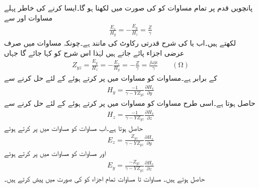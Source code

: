 پانچویں قدم پر تمام مساوات کو  کی صورت میں لکھنا ہو گا۔ایسا کرنے کی خاطر پہلے مساوات  اور  سے
\begin{align}\label{مساوات_میوج_ح}
\frac{E_z}{H_y}=-\frac{E_y}{H_z}=\frac{Z}{\gamma}
\end{align}
لکھتے ہیں۔اب  یا  کی شرح قدرتی رکاوٹ کی مانند ہے۔چونکہ  مساوات  میں صرف عرضی اجزاء پائے جاتے ہیں لہٰذا اس شرح کو   کہا جائے گا جہاں
\begin{align}\label{مساوات_میوج_خ}
Z_{yz}=\frac{E_y}{H_z}=-\frac{E_z}{H_y}=-\frac{Z}{\gamma}=\frac{j\omega \mu}{\gamma}  \quad \quad (\si{\ohm})
\end{align}
کے برابر ہے۔مساوات  کو مساوات  میں پر کرتے ہوئے  کے لئے حل کرنے سے
\begin{align}\label{مساوات_میوج_د}
H_y=\frac{-1}{\gamma-Y Z_{yz}} \frac{\partial H_x}{\partial y}
\end{align}
حاصل ہوتا ہے۔اسی طرح  مساوات  کو مساوات  میں پر کرتے ہوئے  کے لئے حل کرنے سے
\begin{align}\label{مساوات_میوج_ڈ}
H_z=\frac{-1}{\gamma-Y Z_{yz}} \frac{\partial H_x}{\partial z}
\end{align}
حاصل ہوتا ہے۔اب مساوات  کو مساوات  میں پر کرتے ہوئے
\begin{align}\label{مساوات_میوج_ذ}
E_z=\frac{Z_{yz}}{\gamma-Y Z_{yz}}\frac{\partial H_x}{\partial y}
\end{align}
اور مساوات  کو مساوات  میں پر کرتے ہوئے
\begin{align}\label{مساوات_میوج_ر}
E_y=\frac{-Z_{yz}}{\gamma-Y Z_{yz}}\frac{\partial H_x}{\partial z}
\end{align}
حاصل ہوتے ہیں۔ مساوات  تا مساوات  تمام اجزاء کو  کی صورت میں پیش کرتے ہیں۔ 

